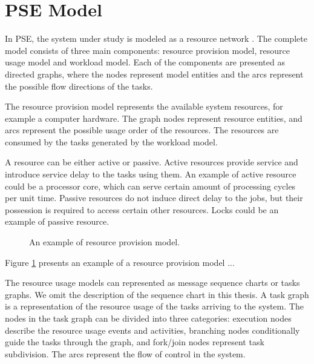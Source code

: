 \section{PSE Model}

In PSE, the system under study is modeled as a resource network \cite{Menasce:1994:CPP:174466}. The complete model consists of three main components: resource provision model, resource usage model and workload model. Each of the components are presented as directed graphs, where the nodes represent model entities and the arcs represent the possible flow directions of the tasks.

The resource provision model represents the available system resources, for example a computer hardware. The graph nodes represent resource entities, and arcs represent the possible usage order of the resources. The resources are consumed by the tasks generated by the workload model.

A resource can be either active or passive. Active resources provide service and introduce service delay to the tasks using them. An example of active resource could be a processor core, which can serve certain amount of processing cycles per unit time. Passive resources do not induce direct delay to the jobs, but their possession is required to access certain other resources. Locks  could be an example of passive resource.

\begin{figure}[h!]
  \begin{center}
    \caption{An example of resource provision model.}
    \label{fig:resource-provision-model}
  \end{center}

\end{figure}

Figure \ref{fig:resource-provision-model} presents an example of a resource provision model ...

The resource usage models can represented as message sequence charts or tasks graphs. We omit the description of the sequence chart in this thesis. A task graph is a representation of the resource usage of the tasks arriving to the system. The nodes in the task graph can be divided into three categories: execution nodes describe the resource usage events and activities, branching nodes conditionally guide the tasks through the graph, and fork/join nodes represent task subdivision. The arcs represent the flow of control in the system.


